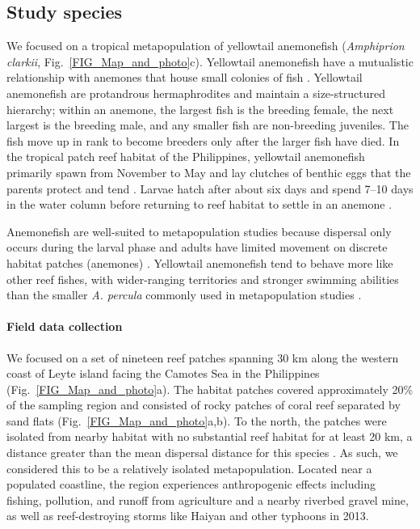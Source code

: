\documentclass[12pt, oneside]{article}   	%
\begin{document}
\subsection*{Study species}

We focused on a tropical metapopulation of yellowtail anemonefish (\textit{Amphiprion clarkii}, Fig.\ \ref{FIG_Map_and_photo}c). Yellowtail anemonefish have a mutualistic relationship with anemones that house small colonies of fish \citep{buston2003social, fautin1992field}. Yellowtail anemonefish are protandrous hermaphrodites and maintain a size-structured hierarchy; within an anemone, the largest fish is the breeding female, the next largest is the breeding male, and any smaller fish are non-breeding juveniles. The fish move up in rank to become breeders only after the larger fish have died. In the tropical patch reef habitat of the Philippines, yellowtail anemonefish primarily spawn from November to May and lay clutches of benthic eggs that the parents protect and tend \citep{ochi1989mating, holtswarth2017fecundity}. Larvae hatch after about six days and spend 7--10 days in the water column before returning to reef habitat to settle in an anemone \citep{fautin1992field}.

Anemonefish are well-suited to metapopulation studies because dispersal only occurs during the larval phase and adults have limited movement on discrete habitat patches (anemones) \citep[e.g.,][]{buston2013marine, salles_coral_2015, almany2017larval}. Yellowtail anemonefish tend to behave more like other reef fishes, with wider-ranging territories and stronger swimming abilities \citep{hattori1991life, ochi1989mating} than the smaller \textit{A. percula} commonly used in metapopulation studies \citep[e.g.,][]{buston2011probability, salles_coral_2015}. %

\paragraph*{Field data collection}

We focused on a set of nineteen reef patches spanning 30 km along the western coast of Leyte island facing the Camotes Sea in the Philippines (Fig.\ \ref{FIG_Map_and_photo}a). The habitat patches covered approximately 20\% of the sampling region and consisted of rocky patches of coral reef separated by sand flats (Fig.\ \ref{FIG_Map_and_photo}a,b). To the north, the patches were isolated from nearby habitat with no substantial reef habitat for at least 20 km, a distance greater than the mean dispersal distance for this species \citep{pinsky2010using}. As such, we considered this to be a relatively isolated metapopulation. Located near a populated coastline, the region experiences anthropogenic effects including fishing, pollution, and runoff from agriculture and a nearby riverbed gravel mine, as well as reef-destroying storms like Haiyan and other typhoons in 2013.%
\end{document}

